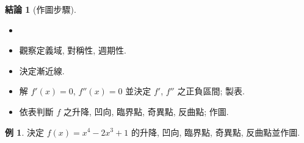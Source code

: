 \documentclass[12pt]{extarticle}
\newcommand{\ds}{\displaystyle}
\theoremstyle{definition}
\newtheorem*{fact}{結論}
\newtheorem*{ex}{例}
\begin{document}
\begin{fact}[作圖步驟]
  \begin{itemize}\setlength\itemsep{0em}
    \item[]
    \item 觀察定義域, 對稱性, 週期性. 
    \item 決定漸近線. 
    \item 解 $f'(x) = 0$, $f''(x) = 0$ 並決定 $f'$, $f''$ 之正負區間; 製表. 
    \item 依表判斷 $f$ 之升降, 凹向, 臨界點, 奇異點, 反曲點; 作圖. 
  \end{itemize}
\end{fact}

\begin{ex}
  決定 $\ds f(x) = x^4 - 2 x^3 + 1$ 的升降, 凹向, 臨界點, 奇異點, 反曲點並作圖. 
\end{ex}
\end{document}
